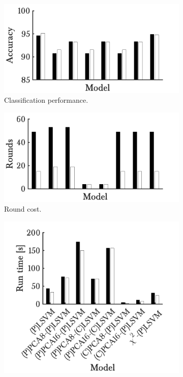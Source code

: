 \begin{figure}[h!]
        \begin{subfigure}[b]{.49\textwidth}  
            \centering 
            \includegraphics[width=.98\textwidth]{parts/chap-4/img-svm/lsvm-timing/acc.png}
            \caption{Classification performance.} 
        \end{subfigure}
        \hfill
        \begin{subfigure}[b]{.49\textwidth}   
            \centering 
            \includegraphics[width=.98\textwidth]{parts/chap-4/img-svm/lsvm-timing/rounds.png}
            \caption{Round cost.} 
        \end{subfigure}
        \hfill
        \begin{subfigure}[b]{.49\textwidth}   
            \centering 
            \includegraphics[width=.98\textwidth]{parts/chap-4/img-svm/lsvm-timing/time.png}

\end{subfigure}
\end{figure}
